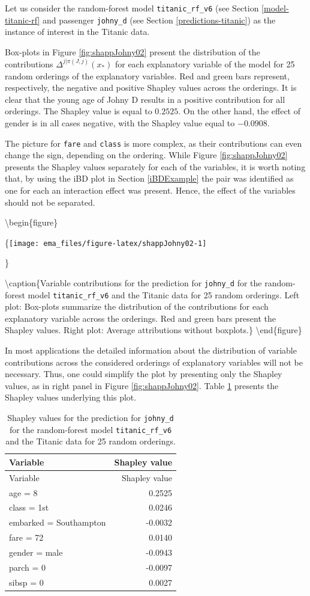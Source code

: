 \documentclass[12pt,]{krantz}
\begin{document}
Let us consider the random-forest model \texttt{titanic\_rf\_v6} (see Section \ref{model-titanic-rf} and passenger \texttt{johny\_d} (see Section \ref{predictions-titanic}) as the instance of interest in the Titanic data.

Box-plots in Figure \ref{fig:shappJohny02} present the distribution of the contributions \(\Delta^{j|\pi(J,j)}(x_*)\) for each explanatory variable of the model for 25 random orderings of the explanatory variables. Red and green bars represent, respectively, the negative and positive Shapley values across the orderings. It is clear that the young age of Johny D results in a positive contribution for all orderings. The Shapley value is equal to \(0.2525\). On the other hand, the effect of gender is in all cases negative, with the Shapley value equal to \(-0.0908\).

The picture for \texttt{fare} and \texttt{class} is more complex, as their contributions can even change the sign, depending on the ordering. While Figure \ref{fig:shappJohny02} presents the Shapley values separately for each of the variables, it is worth noting that, by using the iBD plot in Section \ref{iBDExample} the pair was identified as one for each an interaction effect was present. Hence, the effect of the variables should not be separated.

\textbackslash{}begin\{figure\}

\{\centering \texttt{[image: ema\_files/figure-latex/shappJohny02-1]}

\}

\textbackslash{}caption\{Variable contributions for the prediction for \texttt{johny\_d} for the random-forest model \texttt{titanic\_rf\_v6} and the Titanic data for 25 random orderings. Left plot: Box-plots summarize the distribution of the contributions for each explanatory variable across the orderings. Red and green bars present the Shapley values. Right plot: Average attributions without boxplots.\}\label{fig:shappJohny02}
\textbackslash{}end\{figure\}

In most applications the detailed information about the distribution of variable contributions across the considered orderings of explanatory variables will not be necessary. Thus, one could simplify the plot by presenting only the Shapley values, as in right panel in Figure \ref{fig:shappJohny02}. Table \ref{tab:shapOrderingTable} presents the Shapley values underlying this plot.

\begin{longtable}[]{@{}lr@{}}
\caption{\label{tab:shapOrderingTable} Shapley values for the prediction for \texttt{johny\_d} for the random-forest model \texttt{titanic\_rf\_v6} and the Titanic data for 25 random orderings.}\tabularnewline
\toprule
Variable & Shapley value\tabularnewline
\midrule
\endfirsthead
\toprule
Variable & Shapley value\tabularnewline
\midrule
\endhead
age = 8 & 0.2525\tabularnewline
class = 1st & 0.0246\tabularnewline
embarked = Southampton & -0.0032\tabularnewline
fare = 72 & 0.0140\tabularnewline
gender = male & -0.0943\tabularnewline
parch = 0 & -0.0097\tabularnewline
sibsp = 0 & 0.0027\tabularnewline
\bottomrule
\end{longtable}
\end{document}

